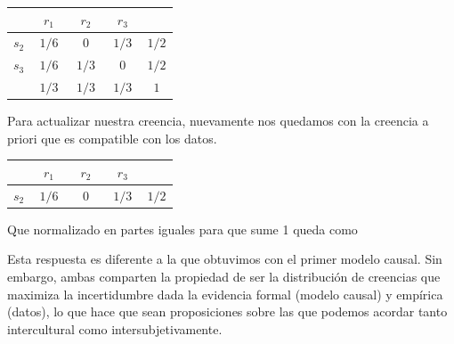 \documentclass[a4paper,10pt]{book}
\theoremstyle{definition}
\begin{document}
\begin{table}[H]
\centering
 \begin{tabular}{c|c|c|c||c} \setlength\tabcolsep{0.4cm} 
        & \, $r_1$ \, &  \, $r_2$ \, & \, $r_3$ \, & \\ \hline 
  $s_2$ & $1/6$ & $0$ & $1/3$ & $1/2$ \\ \hline
  $s_3$ & $1/6$ & $1/3$ & $0$ & $1/2$ \\ \hline \hline 
  & $1/3$& $1/3$ & $1/3$ & $1$
  \end{tabular}
 \end{table}
 
Para actualizar nuestra creencia, nuevamente nos quedamos con la creencia a priori que es compatible con los datos.

\begin{table}[H]
\centering
 \begin{tabular}{c|c|c|c||c} \setlength\tabcolsep{0.4cm} 
        & \, $r_1$ \, &  \, $r_2$ \, & \, $r_3$ \, &  \\ \hline 
  $s_2$ & $1/6$ & $0$ & $1/3$ & $1/2$ \\ \hline
  \end{tabular}
\end{table}

Que normalizado en partes iguales para que sume 1 queda como

\begin{figure}[H]
\centering
{} 
\end{figure}
  
Esta respuesta es diferente a la que obtuvimos con el primer modelo causal.
Sin embargo, ambas comparten la propiedad de ser la distribución de creencias que maximiza la incertidumbre dada la evidencia formal (modelo causal) y empírica (datos), lo que hace que sean proposiciones sobre las que podemos acordar tanto intercultural como intersubjetivamente.
\end{document}
